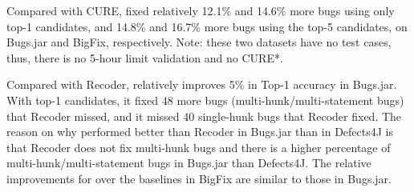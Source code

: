 Compared with CURE, {\tool} fixed relatively 12.1\% and 14.6\% more
bugs using only top-1 candidates, and 14.8\% and 16.7\% more bugs using
the top-5 candidates,
on Bugs.jar and BigFix, respectively. Note: these two datasets have no
test cases, thus, there is no 5-hour limit validation and no CURE*.

Compared with Recoder, {\tool} relatively improves 5\% in Top-1
accuracy in Bugs.jar. With top-1 candidates, it fixed 48 more bugs
(multi-hunk/multi-statement bugs) that Recoder missed, and it missed
40 single-hunk bugs that Recoder fixed. The reason on why {\tool}
performed better than Recoder in Bugs.jar than in Defects4J is that
Recoder does not fix multi-hunk bugs and there is a higher percentage
of multi-hunk/multi-statement bugs in Bugs.jar than Defects4J. The
relative improvements for {\tool} over the baselines in BigFix are
similar to those in Bugs.jar.
